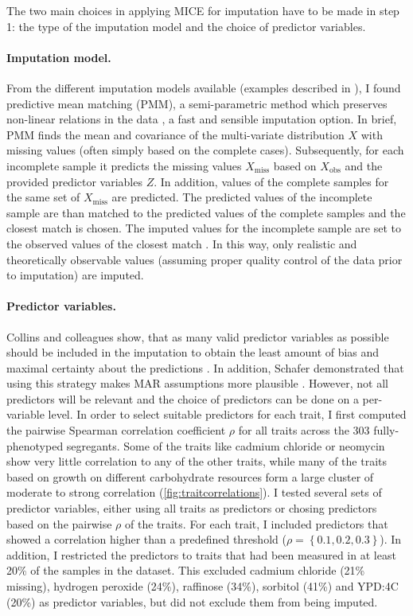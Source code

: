 The two main choices in applying MICE for imputation have to be made in step 1: the type of the imputation model and the choice of predictor variables. 

\paragraph{Imputation model.} From the different imputation models available (examples described in \citep{vanBuuren2011}), I found predictive mean matching (PMM), a semi-parametric method which preserves non-linear relations in the data \citep{Little1988,vanBuuren2011}, a fast and sensible imputation option.  In brief, PMM finds the mean and covariance of the multi-variate distribution \(X\) with missing values (often simply based on the complete cases). Subsequently, for each incomplete sample it predicts the missing values \(X_\text{miss}\) based on \(X_\text{obs}\) and the provided predictor variables \(Z\). In addition, values of the complete samples for the same set of \(X_\text{miss}\) are predicted. The predicted values of the incomplete sample are than matched to the predicted values of the complete samples and the closest match is chosen. The imputed values for the incomplete sample are set to the observed values of the closest match \citep{Little1988}. In this way, only realistic and theoretically observable values (assuming proper quality control of the data prior to imputation) are imputed.

\paragraph{Predictor variables.} Collins and colleagues show, that as many valid predictor variables as possible should be included in the imputation to obtain the least amount of bias and maximal certainty about the predictions \citeyear{Collins2001}. In addition, Schafer demonstrated that using this strategy makes MAR assumptions more plausible \citep{Schafer1997}. However, not all predictors will be relevant and the choice of predictors can be done on a per-variable level. In order to select suitable predictors for each trait, I first computed the pairwise Spearman correlation coefficient \(\rho\) for all traits across the \num{303} fully-phenotyped segregants. Some of the traits like cadmium chloride or neomycin show very little correlation to any of the other traits, while many of the traits based on growth on different carbohydrate resources form a large cluster of moderate to strong correlation (\cref{fig:traitcorrelations}). 
I tested several sets of predictor variables, either using all traits as predictors or chosing predictors based on the pairwise \(\rho\) of the traits. For each trait, I included predictors that showed a correlation higher than a predefined threshold (\(\rho =\left\{0.1, 0.2, 0.3\right\}\)). In addition, I restricted the predictors to traits that had been measured in at least 20\% of the samples in the dataset. This excluded cadmium chloride  (21\% missing), hydrogen peroxide (24\%), raffinose (34\%), sorbitol (41\%) and YPD:4C (20\%) as predictor variables, but did not exclude them from being imputed.

